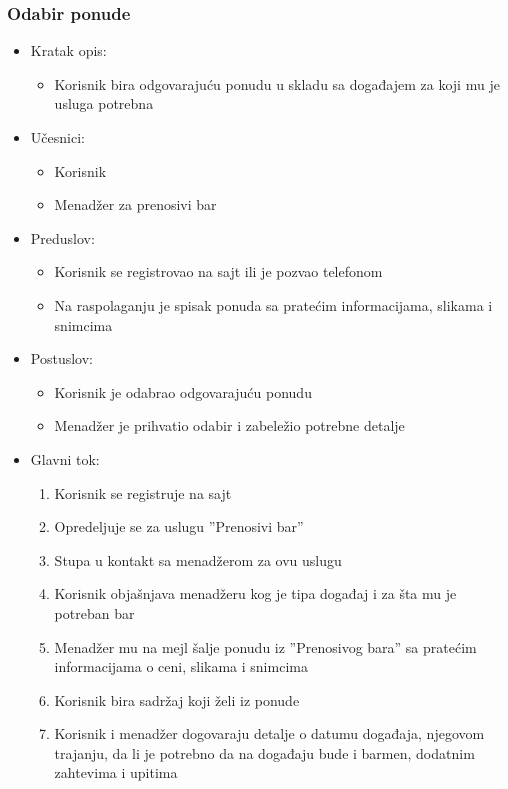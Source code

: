 \documentclass[a4paper]{article}
\begin{document}
\subsubsection{Odabir ponude}

\begin{itemize}
    \item Kratak opis:
        \begin{itemize}
            \item Korisnik bira odgovarajuću ponudu u skladu sa događajem za koji mu je usluga potrebna
        \end{itemize}
    \item Učesnici:
        \begin{itemize}
            \item Korisnik
            \item Menadžer za prenosivi bar
        \end{itemize}
    \item Preduslov:
        \begin{itemize}
            \item Korisnik se registrovao na sajt ili je pozvao telefonom
		    \item Na raspolaganju je spisak ponuda sa pratećim informacijama, slikama i snimcima
        \end{itemize}
    \item Postuslov:
        \begin{itemize}
            \item Korisnik je odabrao odgovarajuću ponudu
            \item Menadžer je prihvatio odabir i zabeležio potrebne detalje
        \end{itemize}
    \item Glavni tok:
        \begin{enumerate}
            \item  Korisnik se registruje na sajt
		    \item Opredeljuje se za uslugu ''Prenosivi bar''
		    \item Stupa u kontakt sa menadžerom za ovu uslugu
		    \item Korisnik objašnjava menadžeru kog je tipa događaj i za šta mu je potreban bar
		    \item Menadžer mu na mejl šalje ponudu iz ''Prenosivog bara'' sa pratećim informacijama o ceni, slikama i snimcima
		    \item Korisnik bira sadržaj koji želi iz ponude
		    \item Korisnik i menadžer dogovaraju detalje o datumu događaja, njegovom trajanju, da li je potrebno da na događaju bude i barmen, dodatnim zahtevima i upitima

\end{enumerate}
\end{itemize}
\end{document}
